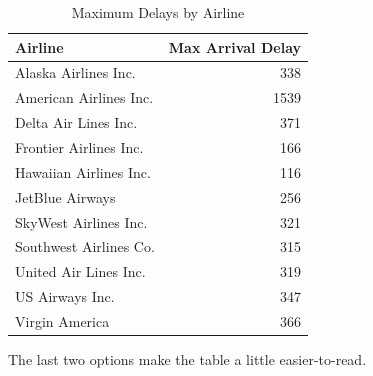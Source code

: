 \documentclass[12pt,oneside]{tisemthesis}
\begin{document}
\begin{longtable}[t]{lr}
\caption[Max Delays by Airline]{\label{tab:maxdelays}Maximum Delays by Airline}\\
\toprule
Airline & Max Arrival Delay\\
\midrule
Alaska Airlines Inc. & 338\\
American Airlines Inc. & 1539\\
Delta Air Lines Inc. & 371\\
Frontier Airlines Inc. & 166\\
Hawaiian Airlines Inc. & 116\\
\addlinespace
JetBlue Airways & 256\\
SkyWest Airlines Inc. & 321\\
Southwest Airlines Co. & 315\\
United Air Lines Inc. & 319\\
US Airways Inc. & 347\\
\addlinespace
Virgin America & 366\\
\bottomrule
\end{longtable}
The last two options make the table a little easier-to-read.
\end{document}
